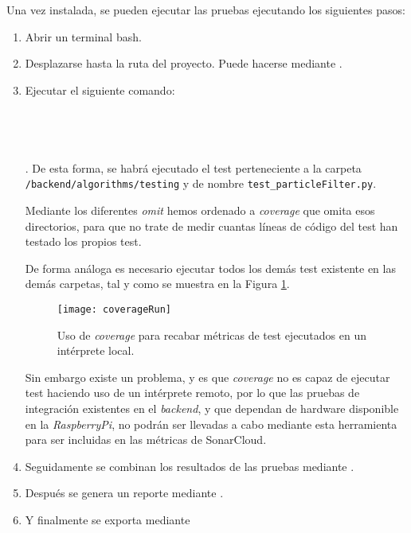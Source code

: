 Una vez instalada, se pueden ejecutar las pruebas ejecutando los siguientes pasos: 
\begin{enumerate}
\item Abrir un terminal bash.
\item Desplazarse hasta la ruta del proyecto. Puede hacerse mediante .
\item Ejecutar el siguiente comando:\\ \\ \\ \\ \\ .
De esta forma, se habrá ejecutado el test perteneciente a la carpeta \texttt{/backend/algorithms/testing} y de nombre \texttt{test\_particleFilter.py}. 

Mediante los diferentes \emph{omit} hemos ordenado a \emph{coverage} que omita esos directorios, para que no trate de medir cuantas líneas de código del test han testado los propios test.

De forma análoga es necesario ejecutar todos los demás test existente en las demás carpetas, tal y como se muestra en la Figura \ref{fig:coverageRun}.
\begin{figure}[H]
	\centering
	\texttt{[image: coverageRun]}
	\caption[Uso de \emph{coverage} para recabar métricas de test]{Uso de \emph{coverage} para recabar métricas de test ejecutados en un intérprete local.}\label{fig:coverageRun}
\end{figure}

Sin embargo existe un problema, y es que \emph{coverage} no es capaz de ejecutar test haciendo uso de un intérprete remoto, por lo que las pruebas de integración existentes en el \emph{backend}, y que dependan de hardware disponible en la \emph{RaspberryPi}, no podrán ser llevadas a cabo mediante esta herramienta para ser incluidas en las métricas de SonarCloud.

\item Seguidamente se combinan los resultados de las pruebas mediante .
\item Después se genera un reporte mediante .
\item Y finalmente se exporta mediante 
\end{enumerate}

